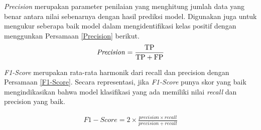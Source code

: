     \textit{Precision} merupakan parameter penilaian yang menghitung jumlah data yang benar antara nilai sebenarnya dengan hasil prediksi model. Digunakan juga untuk mengukur seberapa baik model dalam mengidentifikasi kelas positif dengan menggunkan Persamaan \ref{Precision} berikut.
     \begin{equation}
        \begin{aligned}
            \text{\textit{Precision}} = \frac{\text{TP}}{\text{TP} + \text{FP}}
        \end{aligned}\label{Precision}
    \end{equation}

    \textit{F1-Score} merupakan rata-rata harmonik dari recall dan precision dengan Persamaan \ref{F1-Score}. Secara representasi, jika \textit{F1-Score} punya skor yang baik mengindikasikan bahwa model klasifikasi yang ada memiliki nilai \textit{recall} dan precision yang baik.

     \begin{equation}
        \begin{aligned}
         F1-Score =   2 \times \frac{precision \times recall}{precision + recall}
        \end{aligned}\label{F1-Score}
    \end{equation}

    


    

